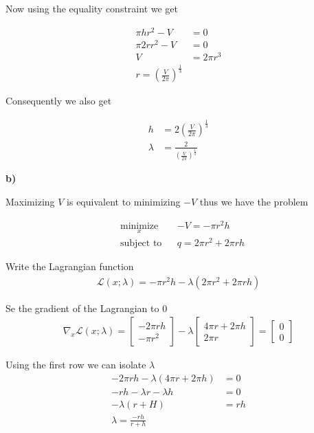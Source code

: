 Now using the equality constraint we get

\begin{align*}
	\pi h r^2 -V &= 0 \\
	\pi 2 r r^2 - V &= 0 \\
	V &= 2 \pi r^3 \\
	r = (\frac{V}{2\pi})^{\frac{1}{3}}
\end{align*}

Consequently we also get

\begin{align*}
	h &= 2 (\frac{V}{2\pi})^{\frac{1}{3}} \\
	\lambda &= \frac{2}{(\frac{V}{2\pi})^{\frac{1}{3}}}
\end{align*}

\textbf{b)}

Maximizing $V$ is equivalent to minimizing $-V$ thus we have the problem

\begin{equation*}
\begin{aligned}
& \underset{x}{\text{minimize}}
& & -V = - \pi r^2 h \\
& \text{subject to}
& & q = 2 \pi r^2 + 2 \pi r h
\end{aligned}
\end{equation*}

Write the Lagrangian function
\begin{align*}
	\mathcal{L}(x; \lambda) = -\pi r^2 h - \lambda(2\pi r^2 + 2 \pi r h)
\end{align*}

Se the gradient of the Lagrangian to $0$
\begin{align*}
	\nabla_x \mathcal{L}(x;\lambda) = \begin{bmatrix}
	-2 \pi r h \\ -\pi r^2
	\end{bmatrix} - \lambda \begin{bmatrix}
		4 \pi r + 2 \pi h \\ 2 \pi r
	\end{bmatrix} = \begin{bmatrix}
	 0 \\ 0
	\end{bmatrix}
\end{align*}

Using the first row we can isolate $\lambda$ 
\begin{align*}
	-2 \pi r h - \lambda (4 \pi r + 2 \pi h) &= 0\\
	-r h - \lambda r - \lambda h &= 0 \\ 
	-\lambda (r+H) &= rh \\
	\lambda = \frac{-rh}{r+h}
\end{align*}

